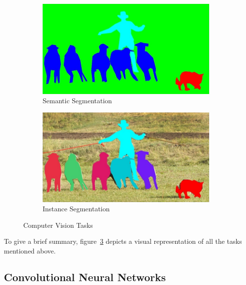 \begin{figure}
    \hfill
    \begin{subfigure}{\imgWidth}
        \includegraphics[width=\textwidth]{images/vision_task_3}
        \caption{Semantic Segmentation}
        \label{fig:cv_task_semseg}
    \end{subfigure}
    \hfill
    \begin{subfigure}{\imgWidth}
        \includegraphics[width=\textwidth]{images/vision_task_4}
        \caption{Instance Segmentation}
        \label{fig:cv_task_inseg}
    \end{subfigure}
    \hfill

    \caption{Computer Vision Tasks~\cite{coco15}}
    \label{fig:cv_tasks}
\end{figure}

To give a brief summary, figure~\ref{fig:cv_tasks} depicts a visual representation of all the tasks mentioned above.

\subsection{Convolutional Neural Networks}
\label{sec:cnn}

